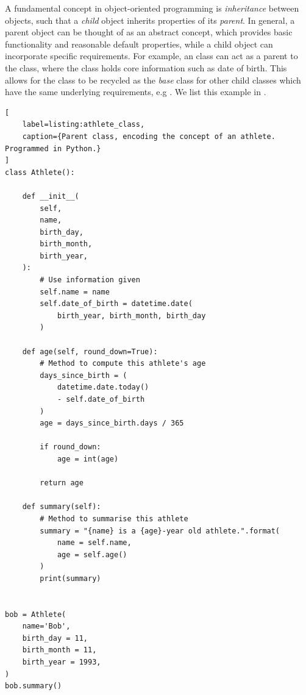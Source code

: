 A fundamental concept in object-oriented programming is \emph{inheritance} between objects, 
    such that a \emph{child} object inherits properties of its \emph{parent}.
In general, a parent object can be thought of as an abstract concept, 
    which provides basic functionality and reasonable default properties,
    while a child object can incorporate specific requirements.
For example, an  class can act as a parent to the  class, 
    where the  class holds core information such as date of birth. 
This allows for the  class to be recycled as the \emph{base} class for other child classes
    which have the same underlying requirements, e.g . 
We list this example in . 

\begin{lstlisting}[
    label=listing:athlete_class,
    caption={Parent class, encoding the concept of an athlete. Programmed in Python.}
]
class Athlete():
    
    def __init__(
        self, 
        name, 
        birth_day, 
        birth_month, 
        birth_year, 
    ):
        # Use information given
        self.name = name
        self.date_of_birth = datetime.date(
            birth_year, birth_month, birth_day
        )
        
    def age(self, round_down=True):
        # Method to compute this athlete's age
        days_since_birth = ( 
            datetime.date.today() 
            - self.date_of_birth
        )
        age = days_since_birth.days / 365
        
        if round_down:
            age = int(age)
        
        return age
    
    def summary(self):
        # Method to summarise this athlete
        summary = "{name} is a {age}-year old athlete.".format(
            name = self.name, 
            age = self.age()
        )
        print(summary)
        
        
bob = Athlete(
    name='Bob',
    birth_day = 11,
    birth_month = 11, 
    birth_year = 1993, 
)
bob.summary()    
\end{lstlisting}

